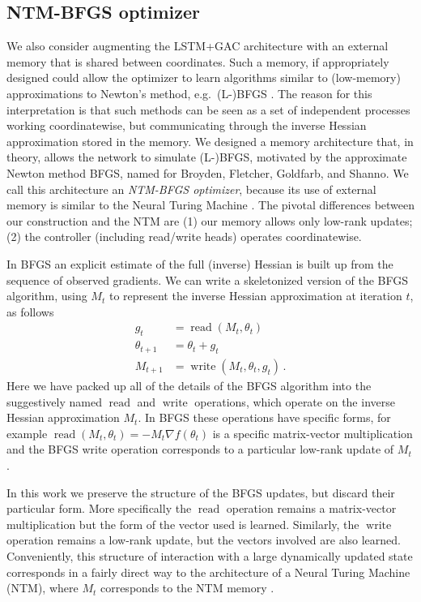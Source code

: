 \documentclass{article}
\begin{document}
\subsection*{NTM-BFGS optimizer}

We also consider augmenting the LSTM+GAC architecture with an external memory
that is shared between coordinates. Such a memory, if appropriately designed
could allow the optimizer to learn algorithms similar to (low-memory)
approximations to Newton's method, e.g.\ (L-)BFGS \citep[see][]{nocedal:2006}.
The reason for this interpretation is that such methods can be seen as a set of
independent processes working coordinatewise, but communicating through the
inverse Hessian approximation stored in the memory.  We designed a memory
architecture that, in theory, allows the network to simulate (L-)BFGS,
motivated by the approximate Newton method BFGS, named for Broyden, Fletcher,
Goldfarb, and Shanno.  We call this architecture an \emph{NTM-BFGS optimizer},
because its use of external memory is similar to the Neural Turing Machine
\citep{graves:2014}.  The pivotal differences between our construction and the
NTM are (1) our memory allows only low-rank updates; (2) the controller
(including read/write heads) operates coordinatewise.

In BFGS an explicit estimate of the full (inverse) Hessian is built up from the sequence of observed gradients.
We can write a skeletonized version of the BFGS algorithm, using $M_t$ to represent the inverse Hessian approximation at iteration $t$, as follows
\begin{align*}
g_t &= \operatorname{read}(M_t, \theta_t) \\
\theta_{t+1} &= \theta_{t} + g_t \\
M_{t+1} &= \operatorname{write}(M_t, \theta_t, g_t)
\,.
\end{align*}
Here we have packed up all of the details of the BFGS algorithm into the
suggestively named $\operatorname{read}$ and $\operatorname{write}$ operations,
which operate on the inverse Hessian approximation $M_t$.  In BFGS these
operations have specific forms, for example $\operatorname{read}(M_t, \theta_t)
= -M_t\nabla f(\theta_t)$ is a specific matrix-vector multiplication and
the BFGS write operation corresponds to a particular low-rank update of $M_t$.

In this work we preserve the structure of the BFGS updates, but discard their
particular form. More specifically the $\operatorname{read}$ operation remains
a matrix-vector multiplication but the form of the vector used is learned.
Similarly, the $\operatorname{write}$ operation remains a low-rank update, but the
vectors involved are also learned. Conveniently, this structure of interaction with
a large dynamically updated state corresponds in a fairly direct way to the
architecture of a Neural Turing Machine (NTM), where $M_t$ corresponds to the
NTM memory \citep{graves:2014}.
\end{document}
